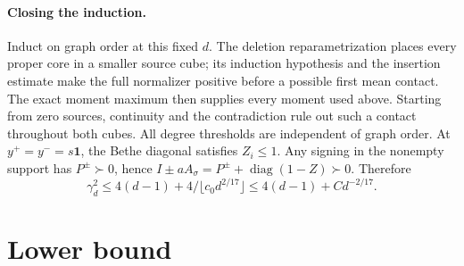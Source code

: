 \documentclass[10pt]{article}
\numberwithin{equation}{section}
\newcommand{\1}{\mathbf1}
\begin{document}
\paragraph{Closing the induction.}
Induct on graph order at this fixed $d$. The deletion
reparametrization places every proper core in a smaller source
cube; its induction hypothesis and the insertion estimate make
the full normalizer positive before a possible first mean contact.
The exact moment maximum then supplies every moment used above.
Starting from zero sources, continuity and the contradiction rule
out such a contact throughout both cubes. All degree thresholds
are independent of graph order. At $y^+=y^-=s\mathbf1$, the
Bethe diagonal satisfies $Z_i\le1$. Any signing in the nonempty
support has $P^\pm\succ0$, hence
$I\pm aA_\sigma=P^\pm+\operatorname{diag}(1-Z)\succ0$.
Therefore
\[
 \gamma_d^2\le4(d-1)+4/\lfloor c_0d^{2/17}\rfloor
                \le4(d-1)+Cd^{-2/17}.
\]

\section{Lower bound}
\end{document}
